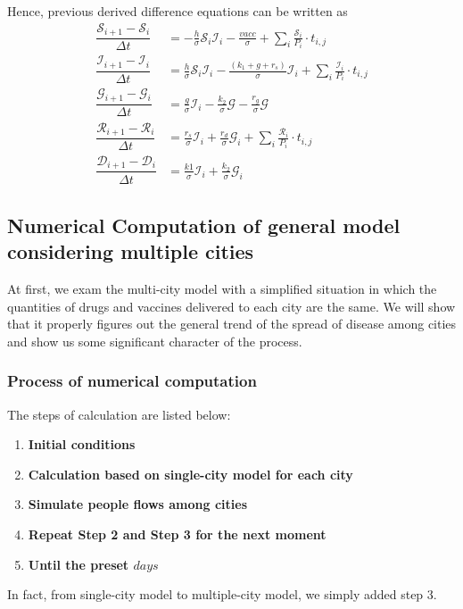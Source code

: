 Hence, previous derived difference equations can be written as
\begin{subequations}
\begin{align}
  \dfrac{\mathcal{S}_{i+1} - \mathcal{S}_{i}}{\Delta t}&=-\frac{h}{\sigma}\mathcal{S}_i\mathcal{I}_i-\frac{vacc}{\sigma}+\sum_i \frac{\mathcal{S}_{i}}{P_{i}}\cdot t_{i,j}\\
  \dfrac{\mathcal{I}_{i+1} - \mathcal{I}_{i}}{\Delta t}&=\frac{h}{\sigma}\mathcal{S}_i\mathcal{I}_i-\frac{(k_1+g+r_s)}{\sigma}\mathcal{I}_i+\sum_i \frac{\mathcal{I}_{i}}{P_{i}}\cdot t_{i,j}\\
  \dfrac{\mathcal{G}_{i+1} - \mathcal{G}_{i}}{\Delta t}&=\frac{g}{\sigma}\mathcal{I}_i-\frac{k_2}{\sigma} \mathcal{G}-\frac{r_g}{\sigma} \mathcal{G}\\
  \dfrac{\mathcal{R}_{i+1} - \mathcal{R}_{i}}{\Delta t}&=\frac{r_s}{\sigma}\mathcal{I}_i+\frac{r_d}{\sigma} \mathcal{G}_i+\sum_i \frac{\mathcal{R}_{i}}{P_{i}}\cdot t_{i,j}\\
  \dfrac{\mathcal{D}_{i+1} - \mathcal{D}_{i}}{\Delta t}&=\frac{k1}{\sigma}\mathcal{I}_i+\frac{k_2}{\sigma} \mathcal{G}_i
\end{align}
\end{subequations} 
 
\subsection{Numerical Computation of general model considering multiple cities}
At first, we exam the multi-city model with a simplified situation in which the quantities of drugs and vaccines delivered to each city are the same. We will show that it properly figures out the general trend of the spread of disease among cities and show us some significant character of the process.
\subsubsection{Process of numerical computation}
The steps of calculation are listed below:
\begin{enumerate}
  \item \textbf{Initial conditions}
  \item \textbf{Calculation based on single-city model for each city }
  \item \textbf{Simulate people flows among cities}
  \item \textbf{Repeat Step 2 and Step 3 for the next moment}
  \item \textbf{Until the preset $days$}
\end{enumerate}
In fact, from single-city model to multiple-city model, we simply added step 3.

